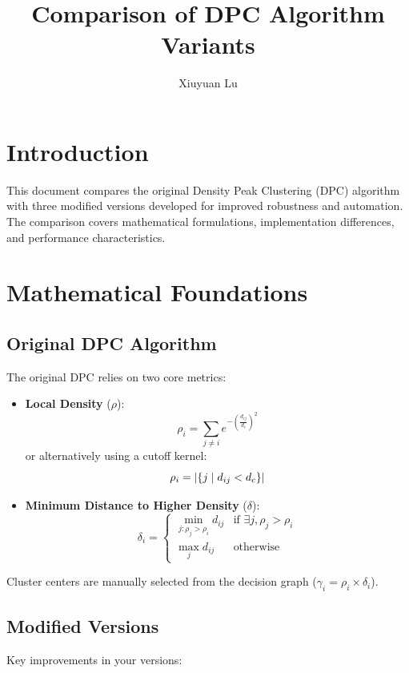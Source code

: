 \documentclass{article}
\title{Comparison of DPC Algorithm Variants}
\author{Xiuyuan Lu}
\date{}
\begin{document}
\maketitle

\section{Introduction}
This document compares the original Density Peak Clustering (DPC) algorithm with three modified versions developed for improved robustness and automation. The comparison covers mathematical formulations, implementation differences, and performance characteristics.

\section{Mathematical Foundations}

\subsection{Original DPC Algorithm}
The original DPC relies on two core metrics:

\begin{itemize}
    \item \textbf{Local Density} ($\rho$):
    \begin{equation}
        \rho_i = \sum_{j \neq i} e^{-\left(\frac{d_{ij}}{d_c}\right)^2}
    \end{equation}
    or alternatively using a cutoff kernel:
    \begin{equation}
        \rho_i = \abs{\{j \mid d_{ij} < d_c\}}
    \end{equation}
    
    \item \textbf{Minimum Distance to Higher Density} ($\delta$):
    \begin{equation}
        \delta_i = \begin{cases}
            \min_{j:\rho_j > \rho_i} d_{ij} & \text{if } \exists j, \rho_j > \rho_i \\
            \max_j d_{ij} & \text{otherwise}
        \end{cases}
    \end{equation}
\end{itemize}

Cluster centers are manually selected from the decision graph ($\gamma_i = \rho_i \times \delta_i$).

\subsection{Modified Versions}
Key improvements in your versions:
\end{document}
